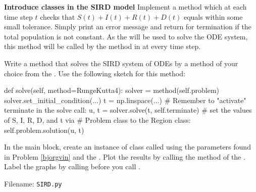 \begin{Problem}{\textbf{Introduce classes in the SIRD model}}
Implement a method  which at each time step $t$ checks that $S(t)+I(t)+R(t)+D(t)$ equals  within some small tolerance. Simply print an error message and return  for termination if the total population is not constant. As the  will be used to solve the ODE system, this method will be called by the  method in  at every time step.

Write a method  that solves the SIRD system of ODEs by a method of your choice from the . Use the following sketch for this method:

\begin{python}
def solve(self, method=RungeKutta4):
    solver = method(self.problem)
    solver.set_initial_condition(...)
    t = np.linspace(...)
    # Remember to "activate" terminate in the solve call:
    u, t = solver.solve(t, self.terminate)
    # set the values of S, I, R, D, and t via
    # Problem class to the Region class:
    self.problem.solution(u, t) 
\end{python}

In the main block, create an instance of class  called  using the parameters found in Problem \ref{bjorgvin} and the . Plot the results by calling the  method of the . Label the graphs by calling  before you call .

Filename: \texttt{SIRD.py}
\end{Problem}


